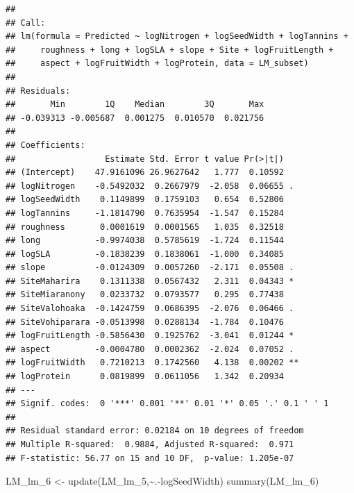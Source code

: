 \documentclass[
  12pt,
]{article}
\newenvironment{Shaded}{\begin{snugshade}}{\end{snugshade}}
\newcommand{\FunctionTok}[1]{\textcolor[rgb]{0.00,0.00,0.00}{#1}}
\newcommand{\NormalTok}[1]{#1}
\newcommand{\OtherTok}[1]{\textcolor[rgb]{0.56,0.35,0.01}{#1}}
\newcommand{\SpecialCharTok}[1]{\textcolor[rgb]{0.00,0.00,0.00}{#1}}
\begin{document}
\begin{verbatim}
## 
## Call:
## lm(formula = Predicted ~ logNitrogen + logSeedWidth + logTannins + 
##     roughness + long + logSLA + slope + Site + logFruitLength + 
##     aspect + logFruitWidth + logProtein, data = LM_subset)
## 
## Residuals:
##       Min        1Q    Median        3Q       Max 
## -0.039313 -0.005687  0.001275  0.010570  0.021756 
## 
## Coefficients:
##                  Estimate Std. Error t value Pr(>|t|)   
## (Intercept)    47.9161096 26.9627642   1.777  0.10592   
## logNitrogen    -0.5492032  0.2667979  -2.058  0.06655 . 
## logSeedWidth    0.1149899  0.1759103   0.654  0.52806   
## logTannins     -1.1814790  0.7635954  -1.547  0.15284   
## roughness       0.0001619  0.0001565   1.035  0.32518   
## long           -0.9974038  0.5785619  -1.724  0.11544   
## logSLA         -0.1838239  0.1838061  -1.000  0.34085   
## slope          -0.0124309  0.0057260  -2.171  0.05508 . 
## SiteMaharira    0.1311338  0.0567432   2.311  0.04343 * 
## SiteMiaranony   0.0233732  0.0793577   0.295  0.77438   
## SiteValohoaka  -0.1424759  0.0686395  -2.076  0.06466 . 
## SiteVohiparara -0.0513998  0.0288134  -1.784  0.10476   
## logFruitLength -0.5856430  0.1925762  -3.041  0.01244 * 
## aspect         -0.0004780  0.0002362  -2.024  0.07052 . 
## logFruitWidth   0.7210213  0.1742560   4.138  0.00202 **
## logProtein      0.0819899  0.0611056   1.342  0.20934   
## ---
## Signif. codes:  0 '***' 0.001 '**' 0.01 '*' 0.05 '.' 0.1 ' ' 1
## 
## Residual standard error: 0.02184 on 10 degrees of freedom
## Multiple R-squared:  0.9884, Adjusted R-squared:  0.971 
## F-statistic: 56.77 on 15 and 10 DF,  p-value: 1.205e-07
\end{verbatim}

\begin{Shaded}
\begin{Highlighting}[]
\NormalTok{LM\_lm\_6 }\OtherTok{\textless{}{-}} \FunctionTok{update}\NormalTok{(LM\_lm\_5,}\SpecialCharTok{\textasciitilde{}}\NormalTok{.}\SpecialCharTok{{-}}\NormalTok{logSeedWidth)}
\FunctionTok{summary}\NormalTok{(LM\_lm\_6)}
\end{Highlighting}
\end{Shaded}
\end{document}
